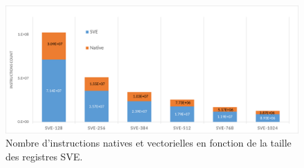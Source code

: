 \begin{figure}[!h]
  \centering
  \includegraphics[width=.7\textwidth]{img/inscount_gnu.pdf}
  \caption{Nombre d'instructions natives et vectorielles en fonction de la
    taille des registres SVE.}
  \label{fig:inscount}
\end{figure}
